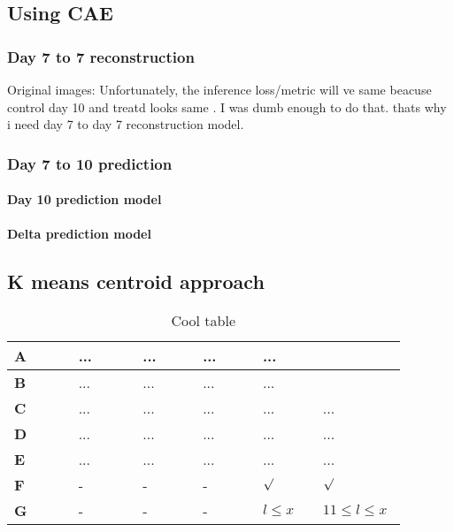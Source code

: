 \subsection{Using CAE} \label{subection:Using CAE}
\subsubsection{Day 7 to 7 reconstruction} \label{subsubection:Day 7 to 7 reconstruction}
Original images: Unfortunately, the inference loss/metric will ve same beacuse control day 10 and treatd looks same . I was dumb enough to do that. thats why i need  day 7 to day 7 reconstruction model.
\subsubsection{Day 7 to 10 prediction} \label{subsubection:Day 7 to 10 prediction}
\paragraph{Day 10 prediction model} \label{paragraph:Day 10 prediction model}
\paragraph{Delta prediction model} \label{paragraph:delta prediction}
\subsection{K means centroid approach} \label{subsection:kmeanscentroid}




\lipsum[3]
\begin{table}[H]
	\begin{center}
		\def\arraystretch{2}
		\begin{tabular}{p{0.155\linewidth}|p{0.15\linewidth}|p{0.145\linewidth}|p{0.14\linewidth}|p{0.14\linewidth}|p{0.15\linewidth}}
			\textbf{A}& ...	&...	&... &...  \\
			\hline \textbf{B} &...&...&... &... \\
			\hline \textbf{C} & ... &... &... &... &... \\
			\hline \textbf{D} & ... &...&... &... &... \\
			\hline \textbf{E} & ... &... &... &... &... \\
			\hline \textbf{F} & - &- &- &$\surd$  &$\surd$  \\
			\hline \textbf{G} & - & -& - & $l \leq x$ & $11 \leq l \leq x$\\
		\end{tabular}
	\end{center}
	\caption{Cool table}
	\label{tab:cool_table}
\end{table}